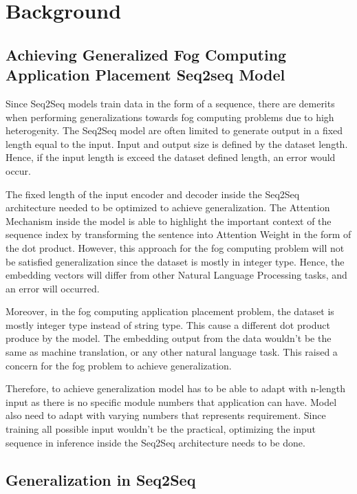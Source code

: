\documentclass[conference]{IEEEtran}
\begin{document}
\section{Background}

\subsection{Achieving Generalized Fog Computing Application Placement Seq2seq Model}

Since Seq2Seq models train data in the form of a sequence, there are demerits when performing generalizations towards fog computing problems due to high heterogenity. The Seq2Seq model are often limited to generate output in a fixed length equal to the input. Input and output size is defined by the dataset length. Hence, if the input length is exceed the dataset defined length, an error would occur. 

The fixed length of the input encoder and decoder inside the Seq2Seq architecture needed to be optimized to achieve generalization. The Attention Mechanism inside the model is able to highlight the important context of the sequence index by transforming the sentence into Attention Weight in the form of the dot product. However, this approach for the fog computing problem will not be satisfied generalization since the dataset is mostly in integer type. Hence, the embedding vectors will differ from other Natural Language Processing tasks, and an error will occurred. 

Moreover, in the fog computing application placement problem, the dataset is mostly integer type instead of string type. This cause a different dot product produce by the model. The embedding output from the data wouldn't be the same as machine translation, or any other natural language task. This raised a concern for the fog problem to achieve generalization.

Therefore, to achieve generalization model has to be able to adapt with n-length input as there is no specific module numbers that application can have. Model also need to adapt with varying numbers that represents requirement. Since training all possible input wouldn't be the practical, optimizing the input sequence in inference inside the Seq2Seq architecture needs to be done.

\subsection{Generalization in Seq2Seq}
\end{document}
